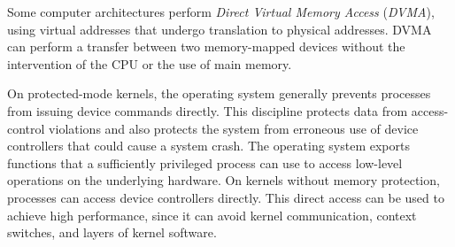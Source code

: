 \begin{definition}
  \begin{remark}\label{rmk:Direct_Virtual_Memory_Access}
    Some computer architectures perform \emph{Direct Virtual Memory Access} (\emph{DVMA}), using virtual addresses that undergo translation to physical addresses.
    DVMA can perform a transfer between two memory-mapped devices without the intervention of the CPU or the use of main memory.
  \end{remark}
\end{definition}

On protected-mode kernels, the operating system generally prevents processes from issuing device commands directly.
This discipline protects data from access-control violations and also protects the system from erroneous use of device controllers that could cause a system crash.
The operating system exports functions that a sufficiently privileged process can use to access low-level operations on the underlying hardware.
On kernels without memory protection, processes can access device controllers directly.
This direct access can be used to achieve high performance, since it can avoid kernel communication, context switches, and layers of kernel software.

